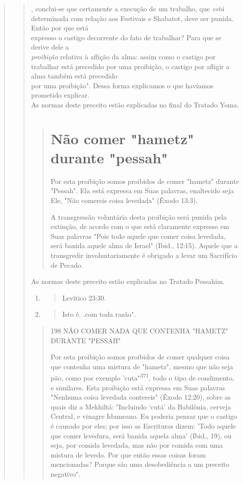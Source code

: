 \begin{quote}
\begin{quote}
, conclui-se que certamente a execução de um trabalho, que \emph{está}
determinada
com relação aos Festivais e Shabatot, deve ser punida. Então por que
está\\
expresso o castigo decorrente do fato de trabalhar? Para que se derive
dele a\\
\emph{proibição} relativa à aflição da alma: assim como o castigo por
trabalhar está precedido
por uma proibição, o castigo por afligir a alma também está
precedido\\
por uma proibição". Dessa forma explicamos o que havíamos prometido
explicar.\\
As normas deste preceito estão explicadas no final do Tratado Yoma.

\begin{quote}
\section{Não comer "hametz" durante "pessah"}

Por esta proibição somos proibidos de comer "hametz" durante "Pes­sah".
Ela está expressa em Suas palavras, enaltecido seja Ele, "Não comereis
coisa levedada" (Êxodo 13:3).

A transgressão voluntária desta proibição será punida pela extinção, de
acordo com o que está claramente expresso em Suas palavras "Pois todo
aquele que comer coisa levedada, será banida aquele alma de Israel"
(Ibid., 12:15). Aquele que a transgredir involuntariamente é obrigado a
levar um Sa­crifício de Pecado.
\end{quote}

As normas deste preceito estão explicadas no Tratado Pessahim.

\begin{enumerate}
\def\labelenumi{\arabic{enumi}.}
\setcounter{enumi}{368}
\item
 \begin{quote}
 Levítico 23:30.
 \end{quote}
\item
 \begin{quote}
 Isto é. .com toda razão".
 \end{quote}
\end{enumerate}

\begin{quote}198 NÃO COMER NADA QUE CONTENHA "HAMETZ" DURANTE "PESSAH"

Por esta proibição somos proibidos de comer qualquer coisa que con­tenha
uma mistura de "hametz", mesmo que não seja pão, como por exemplo
'cuta"\textsuperscript{371}, todo o tipo de condimento, e similares.
Esta proibição está expres­sa em Suas palavras "Nenhuma coisa levedada
contereis" (Êxodo 12:20), sobre as quais diz a Mekhiltá: "Incluindo
`cutá' da Babilônia, cerveja Central, e vina­gre Idumeano. Eu poderia
pensar que o castigo é causado por eles; por isso as Escrituras dizem:
'Todo aquele que comer levedura, será banida aquela al­ma' (Ibid., 19),
ou seja, por comida levedada, mas não por comida com uma mistura de
levedo. Por que então essas coisas foram mencionadas? Porque são uma
desobediência a um preceito negativo".


\end{quote}
\end{quote}
\end{quote}
